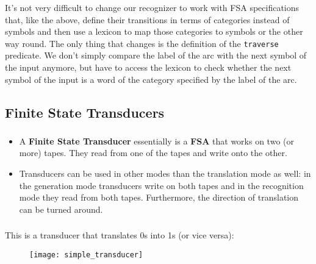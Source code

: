 \begin{frame}

	\frametitle{\insertsection}
	\framesubtitle{\insertsubsection}
	
	It's not very difficult to change our recognizer to work with FSA specifications that, like the above, define their transitions in terms of categories instead of symbols and then use a lexicon to map those categories to symbols or the other way round. The only thing that changes is the definition of the \texttt{traverse} predicate. We don't simply compare the label of the arc with the next symbol of the input anymore, but have to access the lexicon to check whether the next symbol of the input is a word of the category specified by the label of the arc.

\end{frame}


\subsection{Finite State Transducers}


\begin{frame}

	\frametitle{\insertsection}
	\framesubtitle{\insertsubsection}
	
	\begin{itemize}
		\item A \textbf{Finite State Transducer} essentially is a \textbf{FSA} that works on two (or more) tapes. They read from one of the tapes and write onto the other.
		\item Transducers can be used in other modes than the translation mode as well: in the generation mode transducers write on both tapes and in the recognition mode they read from both tapes. Furthermore, the direction of translation can be turned around.
	\end{itemize}

\end{frame}


\begin{frame}

	\frametitle{\insertsection}
	\framesubtitle{\insertsubsection}
	
	This is a transducer that translates 0s into 1s (or vice versa):
	
	\begin{figure}
		\texttt{[image: simple\_transducer]}
	\end{figure}


\end{frame}



